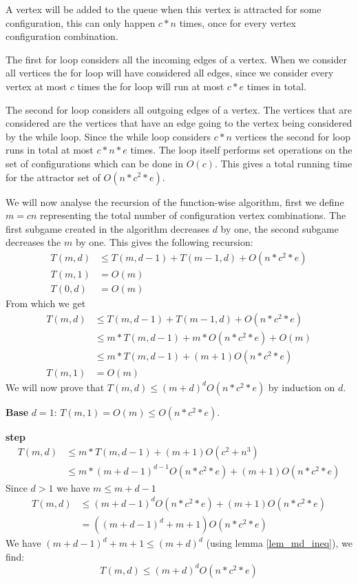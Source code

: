 A vertex will be added to the queue when this vertex is attracted for some configuration, this can only happen $c*n$ times, once for every vertex configuration combination. 

The first for loop considers all the incoming edges of a vertex. When we consider all vertices the for loop will have considered all edges, since we consider every vertex at most $c$ times the for loop will run at most $c*e$ times in total.

The second for loop considers all outgoing edges of a vertex. The vertices that are considered are the vertices that have an edge going to the vertex being considered by the while loop. Since the while loop considers $c*n$ vertices the second for loop runs in total at most $c * n * e$ times. The loop itself performs set operations on the set of configurations which can be done in $O(c)$. This gives a total running time for the attractor set of $O(n*c^2*e)$.

We will now analyse the recursion of the function-wise algorithm, first we define $m = cn$ representing the total number of configuration vertex combinations. The first subgame created in the algorithm decreases $d$ by one, the second subgame decreases the $m$ by one. This gives the following recursion:
\begin{align*}
T(m,d) &\leq T(m, d-1) + T(m-1, d) + O(n*c^2*e)\\
T(m,1) &= O(m)\\
T(0,d) &= O(m)
\end{align*}
From which we get 
\begin{align*}
T(m,d) &\leq T(m, d-1) + T(m-1, d) + O(n*c^2*e)\\
&\leq m*T(m, d-1) + m*O(n*c^2*e) + O(m)\\
&\leq m*T(m, d-1) + (m+1)O(n*c^2*e)\\
T(m,1) &= O(m)
\end{align*}
We will now prove that $T(m,d) \leq (m+d)^dO(n*c^2*e)$ by induction on $d$.

\textbf{Base} $d = 1$: $T(m,1) = O(m) \leq O(n*c^2*e)$.

\textbf{step} 
\begin{align*}
T(m,d) &\leq m*T(m,d-1) + (m+1)O(c^2 + n^3)\\
&\leq m*(m+d-1)^{d-1}O(n*c^2*e) + (m+1)O(n*c^2*e)
\end{align*}
Since $d > 1$ we have $m \leq m+d-1$
\begin{align*}
T(m,d) &\leq (m+d-1)^{d}O(n*c^2*e) + (m+1)O(n*c^2*e)\\
& = ((m+d-1)^d + m + 1)O(n*c^2*e)
\end{align*}
We have $(m+d-1)^d + m + 1 \leq (m+d)^d$ (using lemma \ref{lem_md_ineq}), we find:\\
\[ T(m,d) \leq (m+d)^dO(n*c^2*e) \]

